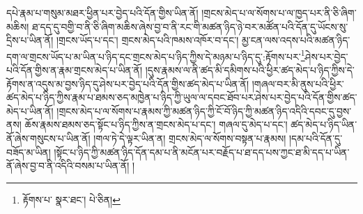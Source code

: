 དཔེ་རྣམ་པ་གསུམ་མཐར་ཕྱིན་པར་བྱེད་པའི་དོན་གྱིས་ཡིན་ནོ། །གྲངས་མེད་པ་ལ་སོགས་པ་ལ་ཁྱད་པར་ནི་ཅི་ཞིག་མཆིས། ཐ་དད་དུ་བགྱི་བ་ནི་ཅི་ཞིག་མཆིས་ཞེས་བྱ་བ་ནི་རང་གི་མཚན་ཉིད་ཉེ་བར་མཚོན་པའི་དོན་དུ་ཡོངས་སུ་དྲིས་པ་ཡིན་ནོ། །གྲངས་ཡོད་པ་དང་། གྲངས་མེད་པའི་ཁམས་འཁོར་བ་དང་། མྱ་ངན་ལས་འདས་པའི་མཚན་ཉིད་དག་ལ་གྲངས་ཡོད་པ་མ་ཡིན་པ་ཉིད་དང་གྲངས་མེད་པ་ཉིད་ཀྱིས་དེ་མཉམ་པ་ཉིད་དུ་:རྟོགས་པར་\footnote{རྟོགས་པ་  སྣར་ཐང་།  པེ་ཅིན། }ཤེས་པར་བྱེད་པའི་དོན་གྱིས་ན་རྣམ་གྲངས་མེད་པ་ཡིན་ནོ། །དུས་རྣམས་ལ་ནི་ཚད་མི་དམིགས་པའི་ཕྱིར་ཚད་མེད་པ་ཉིད་ཀྱིས་དེ་རྟོགས་ན་འདུས་མ་བྱས་ཉིད་དུ་ཤེས་པར་བྱེད་པའི་དོན་གྱིས་ཚད་མེད་པ་ཡིན་ནོ། །གཞལ་བར་མི་ནུས་པའི་ཕྱིར་ཚད་མེད་པ་ཉིད་ཀྱིས་རྣམ་པ་ཐམས་ཅད་མཁྱེན་པ་ཉིད་ཀྱི་ཡུལ་ལ་དབང་ཐོབ་པར་ཤེས་པར་བྱེད་པའི་དོན་གྱིས་ཚད་མེད་པ་ཡིན་ནོ། །གྲངས་མེད་པ་ལ་སོགས་པ་རྣམས་ཀྱི་མཚན་ཉིད་ཀྱི་ངོ་བོ་ཉིད་ཀྱི་མཚན་ཉིད་འདིའི་དབང་དུ་བྱས་ནས། ཆོས་རྣམས་ཐམས་ཅད་སྟོང་པ་ཉིད་ཀྱིས་ན་གྲངས་མེད་པ་དང་། གཞལ་དུ་མེད་པ་དང་། ཚད་མེད་པ་ཉིད་ཡིན་ནོ་ཞེས་གསུངས་པ་ཡིན་ནོ། །གལ་ཏེ་དེ་ལྟར་ཡིན་ན། གྲངས་མེད་ལ་སོགས་བསྟན་པ་རྣམས། །དམ་པའི་དོན་དུ་བཟོད་མ་ཡིན། །སྟོང་པ་ཉིད་ཀྱི་མཚན་ཉིད་དོན་དམ་པ་ནི་མངོན་པར་བརྗོད་པ་ཐ་དད་པས་ཀྱང་ཐ་མི་དད་པ་ཡིན་ནོ་ཞེས་བྱ་བ་ནི་འདིའི་བསམ་པ་ཡིན་ནོ། །
